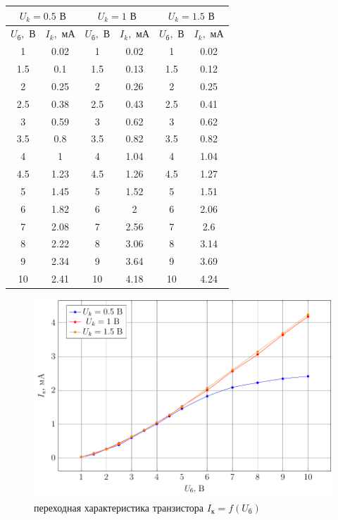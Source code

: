 \begin{table}[htbp]
	\centering
	\begin{tabular}{|c|c|c|c|c|c|}
		\toprule
		\multicolumn{2}{|c|}{$U_k=0.5\text{ В}$} & \multicolumn{2}{c|}{$U_k=1\text{ В}$} & \multicolumn{2}{c|}{$U_k=1.5\text{ В}$} \\
		\midrule
		$U_\text{б}, \text{ В}$  & $I_k, \text{ мА}$ & $U_\text{б}, \text{ В}$  & $I_k, \text{ мА}$ & $U_\text{б}, \text{ В}$  & $I_k, \text{ мА}$ \\
		\midrule
		1     & 0.02  & 1     & 0.02  & 1     & 0.02 \\
		\midrule
		1.5   & 0.1   & 1.5   & 0.13  & 1.5   & 0.12 \\
		\midrule
		2     & 0.25  & 2     & 0.26  & 2     & 0.25 \\
		\midrule
		2.5   & 0.38  & 2.5   & 0.43  & 2.5   & 0.41 \\
		\midrule
		3     & 0.59  & 3     & 0.62  & 3     & 0.62 \\
		\midrule
		3.5   & 0.8   & 3.5   & 0.82  & 3.5   & 0.82 \\
		\midrule
		4     & 1     & 4     & 1.04  & 4     & 1.04 \\
		\midrule
		4.5   & 1.23  & 4.5   & 1.26  & 4.5   & 1.27 \\
		\midrule
		5     & 1.45  & 5     & 1.52  & 5     & 1.51 \\
		\midrule
		6     & 1.82  & 6     & 2     & 6     & 2.06 \\
		\midrule
		7     & 2.08  & 7     & 2.56  & 7     & 2.6 \\
		\midrule
		8     & 2.22  & 8     & 3.06  & 8     & 3.14 \\
		\midrule
		9     & 2.34  & 9     & 3.64  & 9     & 3.69 \\
		\midrule
		10    & 2.41  & 10    & 4.18  & 10    & 4.24 \\
		\bottomrule
	\end{tabular}%
\end{table}%
\begin{figure}[H]
	\centering
	\includegraphics[width=\linewidth]{plot/plot2}
	\caption{переходная характеристика транзистора $I_\text{к}=f(U_\text{б})$}
	\label{fig:11}
\end{figure}
